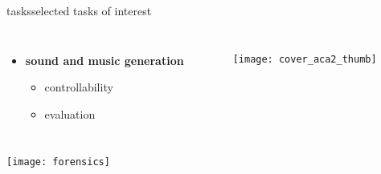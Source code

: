\begin{frame}{tasks}{selected tasks of interest}
\begin{columns}
\begin{itemize}
                 \item<3->  \textbf{sound and music generation}
                    \begin{itemize}
                        \item   controllability \cite{pati_attribute-based_2020}
                        \item   evaluation \cite{pati_is_2021, watcharasupat_latte_2022}
                    \end{itemize}
            \end{itemize}
            \begin{figure}
                \texttt{[image: cover\_aca2\_thumb]}
            \end{figure}
            \end{columns}
            \vspace{-25mm}
            \begin{flushright}
                \texttt{[image: forensics]}
            \end{flushright}
        \end{frame}
        

